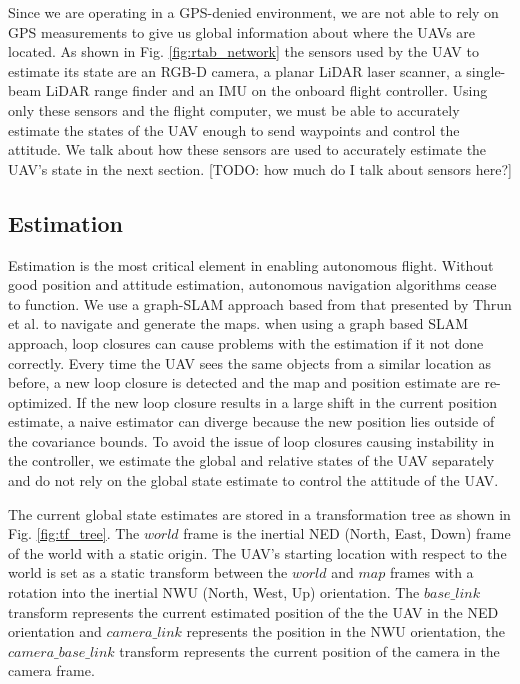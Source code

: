 \documentclass[letterpaper, 10 pt, conference]{ieeeconf}  %
\newcommand{\todo}[1]{{\color{blue}[TODO: #1]}}
\begin{document}
Since we are operating in a GPS-denied environment, we are not able to rely on GPS measurements to give us global information about where the UAVs are located. As shown in Fig. \ref{fig:rtab_network} the sensors used by the UAV to estimate its state are an RGB-D camera, a planar LiDAR laser scanner, a single-beam LiDAR range finder and an IMU on the onboard flight controller. Using only these sensors and the flight computer, we must be able to accurately estimate the states of the UAV enough to send waypoints and control the attitude. We talk about how these sensors are used to accurately estimate the UAV's state in the next section. \todo{how much do I talk about sensors here?}

\subsection{Estimation}

Estimation is the most critical element in enabling autonomous flight. Without good position and attitude estimation, autonomous navigation algorithms cease to function. We use a graph-SLAM approach based from that presented by Thrun et al. \cite{Thrun2006} to navigate and generate the maps. when using a graph based SLAM approach, loop closures can cause problems with the estimation if it not done correctly. Every time the UAV sees the same objects from a similar location as before, a new loop closure is detected and the map and position estimate are re-optimized. If the new loop closure results in a large shift in the current position estimate, a naive estimator can diverge because the new position lies outside of the covariance bounds. To avoid the issue of loop closures causing instability in the controller, we estimate the global and relative states of the UAV separately and do not rely on the global state estimate to control the attitude of the UAV.

The current global state estimates are stored in a transformation tree as shown in Fig. \ref{fig:tf_tree}. The $\mathit{world}$ frame is the inertial NED (North, East, Down) frame of the world with a static origin. The UAV's starting location with respect to the world is set as a static transform between the $\mathit{world}$ and $\mathit{map}$ frames with a rotation into the inertial NWU (North, West, Up) orientation. The $\mathit{base\_link}$ transform represents the current estimated position of the the UAV in the NED orientation and $\mathit{camera\_link}$ represents the position in the NWU orientation, the $\mathit{camera\_base\_link}$ transform represents the current position of the camera in the camera frame.
\end{document}

